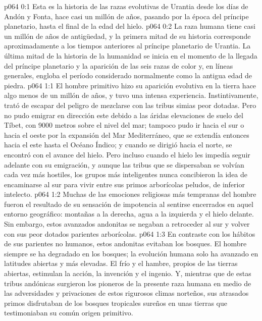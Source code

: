 \author{Portador de vida}
\vs p064 0:1 Esta es la historia de las razas evolutivas de Urantia desde los días de Andón y Fonta, hace casi un millón de años, pasando por la época del príncipe planetario, hasta el final de la edad del hielo.
\vs p064 0:2 La raza humana tiene casi un millón de años de antigüedad, y la primera mitad de su historia corresponde aproximadamente a los tiempos anteriores al príncipe planetario de Urantia. La última mitad de la historia de la humanidad se inicia en el momento de la llegada del príncipe planetario y la aparición de las seis razas de color y, en líneas generales, engloba el período considerado normalmente como la antigua edad de piedra.
\vs p064 1:1 El hombre primitivo hizo su aparición evolutiva en la tierra hace algo menos de un millón de años, y tuvo una intensa experiencia. Instintivamente, trató de escapar del peligro de mezclarse con las tribus simias peor dotadas. Pero no pudo emigrar en dirección este debido a las áridas elevaciones de suelo del Tíbet, con 9000 metros sobre el nivel del mar; tampoco pudo ir hacia el sur o hacia el oeste por la expansión del Mar Mediterráneo, que se extendía entonces hacia el este hasta el Océano Índico; y cuando se dirigió hacia el norte, se encontró con el avance del hielo. Pero incluso cuando el hielo les impedía seguir adelante con su emigración, y aunque las tribus que se dispersaban se volvían cada vez más hostiles, los grupos más inteligentes nunca concibieron la idea de encaminarse al sur para vivir entre sus primos arborícolas peludos, de inferior intelecto.
\vs p064 1:2 Muchas de las emociones religiosas más tempranas del hombre fueron el resultado de su sensación de impotencia al sentirse encerrados en aquel entorno geográfico: montañas a la derecha, agua a la izquierda y el hielo delante. Sin embargo, estos avanzados andonitas se negaban a retroceder al sur y volver con sus peor dotados parientes arborícolas.
\vs p064 1:3 En contraste con los hábitos de sus parientes no humanos, estos andonitas evitaban los bosques. El hombre siempre se ha degradado en los bosques; la evolución humana solo ha avanzado en latitudes abiertas y más elevadas. El frío y el hambre, propios de las tierras abiertas, estimulan la acción, la invención y el ingenio. Y, mientras que de estas tribus andónicas surgieron los pioneros de la presente raza humana en medio de las adversidades y privaciones de estos rigurosos climas norteños, sus atrasados primos disfrutaban de los bosques tropicales sureños en unas tierras que testimoniaban su común origen primitivo.
